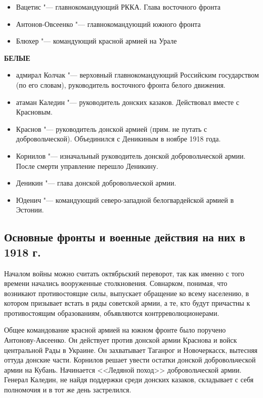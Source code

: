 \begin{itemize}
	\item Вацетис "--- главнокомандующий РККА. Глава восточного фронта
	\item Антонов-Овсеенко "--- главнокомандующий южного фронта
	\item Блюхер "--- командующий красной армией на Урале
\end{itemize}

\textbf{БЕЛЫЕ}

\begin{itemize}
	\item адмирал Колчак "--- верховный главнокомандующий Российским государством (по его словам), руководитель восточного фронта белого движения.
	\item атаман Каледин "--- руководитель донских казаков. Действовал вместе с Красновым. 
	\item Краснов "--- руководитель донской армией (прим. не путать с добровольческой). Объединился с Деникиным в ноябре 1918 года.
	\item Корнилов "--- изначальный руководитель донской добровольческой армии. После смерти управление перешло Деникину.
	\item Деникин "--- глава донской добровольческой армии.
	\item Юденич "--- командующий северо-западной белогвардейской армией в Эстонии.
\end{itemize}

\subsection{Основные фронты и военные действия на них в 1918 г.}

Началом войны можно считать октябрьский переворот, так как именно с того времени начались вооруженные столкновения. Совнарком, понимая, что возникают противостоящие силы, выпускает обращение ко всему населению, в котором призывает встать в ряды советской армии, а те, кто будут причастны к противостоящим образованиям, объявляются контрреволюционерами.

Общее командование красной армией на южном фронте было поручено Антонову-Авсеенко. Он действует против донской армии Краснова и войск центральной Рады в Украине. Он захватывает Таганрог и Новочеркасск, вытесняя оттуда донские части. Корнилов решает увести остатки донской добровольческой армии на Кубань. Начинается <<Ледяной поход>> добровольческой армии. Генерал Каледин, не найдя поддержки среди донских казаков, складывает с себя полномочия и в тот же день застрелился.

